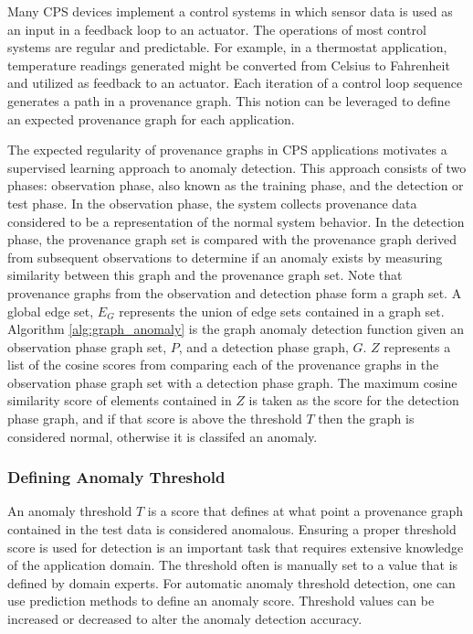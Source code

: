 \par Many CPS devices implement a control systems in which sensor data is used as an input in a feedback loop to an actuator. The operations of most control systems are regular and predictable. For example, in a thermostat application, temperature readings generated might be converted from Celsius to Fahrenheit and utilized as feedback to an actuator. Each iteration of a control loop sequence generates a path in a provenance graph. This notion can be leveraged to define an expected provenance graph for each application. 

\par The expected regularity of provenance graphs in CPS applications motivates a supervised learning approach to anomaly detection. This approach consists of two phases: observation phase, also known as the training phase, and the detection or test phase. In the observation phase, the system collects provenance data considered to be a representation of the normal system behavior. In the detection phase, the provenance graph set is compared with the provenance graph derived from subsequent observations to determine if an anomaly exists by measuring similarity between this graph and the provenance graph set. Note that provenance graphs from the observation and detection phase form a graph set. A global edge set, $E_G$ represents the union of edge sets contained in a graph set. Algorithm \ref{alg:graph_anomaly} is the graph anomaly detection function given an observation phase graph set, $P$, and a detection phase graph, $G$. $Z$ represents a list of the cosine scores from comparing each of the provenance graphs in the observation phase graph set with a detection phase graph. The maximum cosine similarity score of elements contained in $Z$ is taken as the score for the detection phase graph, and if that score is above the threshold $T$ then the graph is considered normal, otherwise it is classifed an anomaly.

\subsubsection{Defining Anomaly Threshold}

An anomaly threshold $T$ is a score that defines at what point a provenance graph contained in the test data is considered anomalous. Ensuring a proper threshold score is used for detection is an important task that requires extensive knowledge of the application domain. The threshold often is manually set to a value that is defined by domain experts. For automatic anomaly threshold detection, one can use prediction methods to define an anomaly score. Threshold values can be increased or decreased to alter the anomaly detection accuracy.




